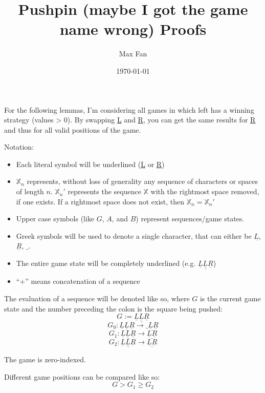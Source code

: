 \documentclass[11pt]{article}
\author{Max Fan}
\date{\today}
\title{Pushpin (maybe I got the game name wrong) Proofs}
\begin{document}
\maketitle
For the following lemmas, I'm considering all games in which left has a winning strategy (values > 0).
By swapping \underline{L} and \underline{R}, you can get the same results for \underline{R} and thus for all valid positions of the game.

\bigskip

Notation:

\begin{itemize}
\item Each literal symbol will be underlined (\underline{L} or \underline{R})

\item \(\mathbb{X}_{n}\) represents, without loss of generality any sequence of characters or spaces of length \(n\).
\(\mathbb{X}_{n}'\) represents the sequence \(\mathbb{X}\) with the rightmost space removed, if one exists.
If a rightmost space does not exist, then \(\mathbb{X}_{n}=\mathbb{X}_{n}'\)

\item Upper case symbols (like \(G\), \(A\), and \(B\)) represent sequences/game states.

\item Greek symbols will be used to denote a single character, that can either be \(\underline{L}\), \(\underline{R}\), \(\_\).

\item The entire game state will be completely underlined (e.g. \(\underline{\underline{L} \underline{L} \underline{R}}\))

\item ``+'' means concatenation of a sequence
\end{itemize}

The evaluation of a sequence will be denoted like so, where \(G\) is the current game state and the number preceding the colon is the square being pushed:
$$G := \underline{\underline{L} \underline{L} \underline{R}}$$
$$G_{0}: \underline{\underline{L} \underline{L} \underline{R}} \to \underline{\_ \underline{L} \underline{R}}$$
$$G_{1}: \underline{\underline{L} \underline{L} \underline{R}} \to \underline{\underline{L} \underline{R}}$$
$$G_{2}: \underline{\underline{L} \underline{L} \underline{R}} \to \underline{\underline{L} \underline{R}}$$

The game is zero-indexed.

Different game positions can be compared like so:
$$G > G_{1} \ge G_{2}$$
\end{document}
